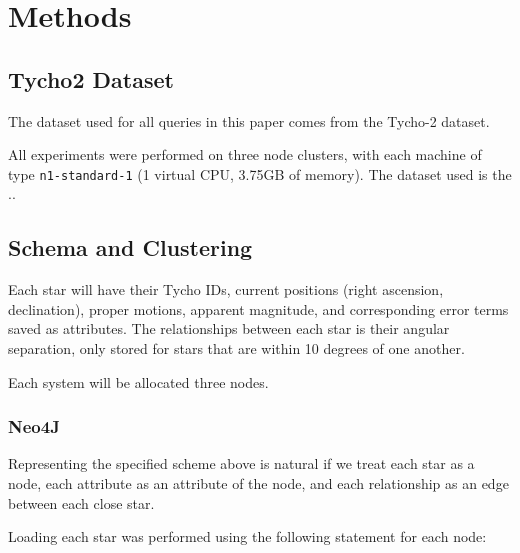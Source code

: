 \section{Methods}\label{sec:methods}
\subsection{Tycho2 Dataset}\label{subsec:tycho2Dataset}
The dataset used for all queries in this paper comes from the Tycho-2 dataset.


All experiments were performed on three node clusters, with each machine of type \texttt{n1-standard-1} (1 virtual CPU,
3.75GB of memory).
The dataset used is the ..

\subsection{Schema and Clustering}\label{subsec:schema}
Each star will have their Tycho IDs, current positions (right ascension, declination), proper motions, apparent
magnitude, and corresponding error terms saved as attributes.
The relationships between each star is their angular separation, only stored for stars that are within 10 degrees of
one another.

Each system will be allocated three nodes.

\subsubsection{Neo4J}
Representing the specified scheme above is natural if we treat each star as a node, each attribute as an attribute
of the node, and each relationship as an edge between each close star.

Loading each star was performed using the following statement for each node:

